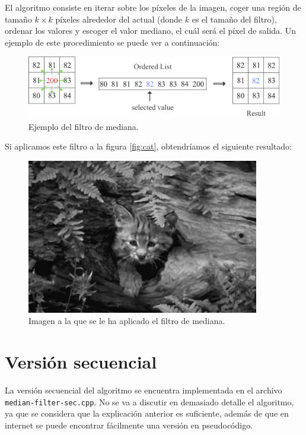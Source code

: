 \documentclass[11pt,a4paper]{article}
\begin{document}
El algoritmo consiste en iterar sobre los píxeles de la imagen, coger una región de tamaño
$k \times k$ píxeles alrededor del actual (donde $k$ es el tamaño del filtro), ordenar
los valores y escoger el valor mediano, el cuál será el píxel de salida. Un ejemplo de este
procedimiento se puede ver a continuación:

\begin{figure}[H]
  \centering
  \includegraphics[scale=0.4]{img/median-filter.png}
  \caption{Ejemplo del filtro de mediana.}
  \label{fig:median-filter}
\end{figure}

Si aplicamos este filtro a la figura \ref{fig:cat}, obtendríamos el siguiente resultado:

\begin{figure}[H]
  \centering
  \includegraphics[scale=0.6]{img/filtered-cat}
  \caption{Imagen a la que se le ha aplicado el filtro de mediana.}
  \label{fig:filtered-cat}
\end{figure}

\section{Versión secuencial}

La versión secuencial del algoritmo se encuentra implementada en el archivo
\texttt{median-filter-sec.cpp}. No se va a discutir en demasiado detalle el algoritmo, ya que
se considera que la explicación anterior es suficiente, además de que en internet se puede
encontrar fácilmente una versión en pseudocódigo.
\end{document}
